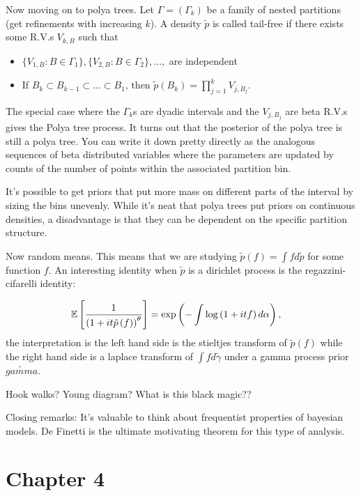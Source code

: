 \documentclass{article}
\begin{document}
Now moving on to polya trees. Let $\Gamma = \left(\Gamma_{k}\right)$ be a family
of nested partitions (get refinements with increasing $k$). A density
$\tilde{p}$ is called tail-free if there exists some R.V.s $V_{k, B}$ such that

\begin{itemize}
\item $\{V_{1, B}: B\in \Gamma_{1}\}, \{V_{2, B} : B \in \Gamma_{2}\}, \dots, $ are independent
\item If $B_{k} \subset B_{k - 1} \subset \dots \subset B_{1}$, then
  $\tilde{p}\left(B_{k}\right) = \prod_{j = 1}^{k} V_{j, B_{j}}$.
\end{itemize}

The special case where the $\Gamma_{k}$s are dyadic intervals and the
$V_{j, B_{j}}$ are beta R.V.s gives the Polya tree process. It turns out that
the posterior of the polya tree is still a polya tree. You can write it down
pretty directly as the analogous sequences of beta distributed variables where
the parameters are updated by counts of the number of points within the
associated partition bin.

It's possible to get priors that put more mass on different parts of the
interval by sizing the bins unevenly. While it's neat that polya trees put
priors on continuous densities, a disadvantage is that they can be dependent on
the specific partition structure.

Now random means. This means that we are studying
$\tilde{p}\left(f\right) = \int f d\tilde{p}$ for some function $f$.
An interesting identity when $\tilde{p}$ is a dirichlet process is the
regazzini-cifarelli identity:

\begin{align}
  \mathbb{E}\left[{\frac{1}{\left(1 + i t \tilde{p}\left(f\right)\right)^{\theta}}}\right] &= \operatorname{exp}\left(-\int \log\left(1 + itf\right) d\alpha\right),
\end{align}
the interpretation is the left hand side is the stieltjes transform of
$\tilde{p}\left(f\right)$ while the right hand side is a laplace transform of
$\int f d\tilde{\gamma}$ under a gamma process prior $\tilde{gamma}$.

Hook walks? Young diagram? What is this black magic??

Closing remarks: It's valuable to think about frequentist properties of bayesian
models. De Finetti is the ultimate motivating theorem for this type of analysis.

\section{Chapter 4}
\label{sec:chapter_4}
\end{document}
